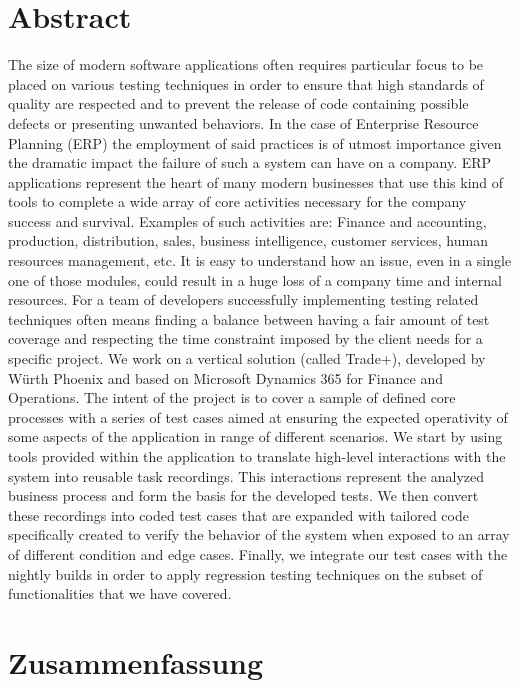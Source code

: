 \chapter*{Abstract} 

The size of modern software applications often requires particular focus to be placed on various testing techniques in order to ensure that high standards of quality are respected and to prevent the release of code containing possible defects or presenting unwanted behaviors. 
In the case of Enterprise Resource Planning (ERP) the employment of said practices is of utmost importance given the dramatic impact the failure of such a system can have on a company. 
ERP applications represent the heart of many modern businesses that use this kind of tools to complete a wide array of core activities necessary for the company success and survival. Examples of such activities are: 
Finance and accounting, production, distribution, sales, business intelligence, customer services, human resources management, etc. 
It is easy to understand how an issue, even in a single one of those modules, could result in a huge loss of a company time and internal resources. 
For a team of developers successfully implementing testing related techniques often means finding a balance between having a fair amount of test coverage and respecting the time constraint imposed by the client needs for a specific project. We work on a vertical solution (called Trade+), developed by Würth Phoenix and based on Microsoft Dynamics 365 for Finance and Operations. The intent of the project is to cover a sample of defined core processes with a series of test cases aimed at ensuring the expected operativity of some aspects of the application in range of different scenarios. We start by using tools provided within the application to translate high-level interactions with the system into reusable task recordings. This interactions represent the analyzed business process and form the basis for the developed tests. We then convert these recordings into coded test cases that are expanded with tailored code specifically created to verify the behavior of the system when exposed to an array of different condition and edge cases. Finally, we integrate our test cases with the nightly builds in order to apply regression testing techniques on the subset of functionalities that we have covered. 

\chapter*{Zusammenfassung}


